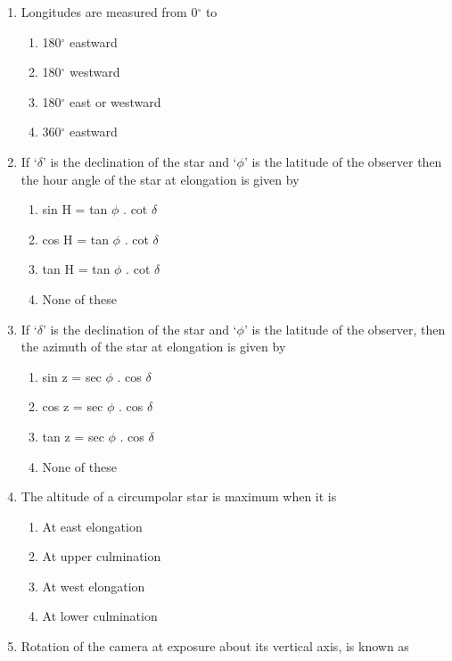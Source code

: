 \documentclass[11pt,a4paper]{article}
\begin{document}
\begin{enumerate}
\item{Longitudes are measured from 0$^\circ$ to
}
\begin{enumerate}[label=\Alph*.]
\item{180$^\circ$ eastward}
\item{180$^\circ$ westward}
\item{180$^\circ$ east or westward}
\item{360$^\circ$ eastward}
\end{enumerate}
\item{If `$\delta$' is the declination of the star and `$\phi$' is the latitude of the observer then the hour angle of the star at elongation is given by
}
\begin{enumerate}[label=\Alph*.]
\item{sin H = tan $\phi$ . cot $\delta$}
\item{cos H = tan $\phi$ . cot $\delta$}
\item{tan H = tan $\phi$ . cot $\delta$}
\item{None of these}
\end{enumerate}
\item{If `$\delta$' is the declination of the star and `$\phi$' is the latitude of the observer, then the azimuth of the star at elongation is given by
}
\begin{enumerate}[label=\Alph*.]
\item{sin z = sec $\phi$ . cos $\delta$}
\item{cos z = sec $\phi$ . cos $\delta$}
\item{tan z = sec $\phi$ . cos $\delta$}
\item{None of these}
\end{enumerate}
\item{The altitude of a circumpolar star is maximum when it is}
\begin{enumerate}[label=\Alph*.]
\item{At east elongation}
\item{At upper culmination}
\item{At west elongation}
\item{At lower culmination}
\end{enumerate}
\item{Rotation of the camera at exposure about its vertical axis, is known as}
\\
\end{enumerate}
\end{document}
